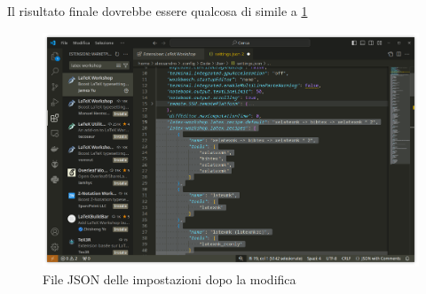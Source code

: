 \documentclass[envcountsame,envcountchap]{svmono}
\begin{document}
Il risultato finale dovrebbe essere qualcosa di simile a \ref{json_impostazioni_nuovo}
\begin{figure}[H]
    \centering
    \includegraphics[width=\linewidth]{images/vscode/vscode_settings_json2.png}
    \caption{File JSON delle impostazioni dopo la modifica}
    \label{json_impostazioni_nuovo}
\end{figure}










\end{document}
